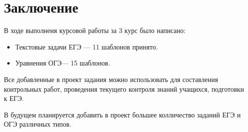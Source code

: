 \section*{Заключение}
В ходе выполнеия курсовой работы за 3 курс было написано:
		      \begin{itemize}
			      \item Текстовые задачи ЕГЭ — 11 шаблонов принято.
			      \item Уравнения ОГЭ— 15 шаблонов.
		      \end{itemize}

Все добавленные в проект задания можно использовать для составления контрольных работ, проведения текущего контроля знаний учащихся, подготовки к ЕГЭ.

В будущем планируется добавить в проект большее колличество заданий ЕГЭ и ОГЭ различных типов.


